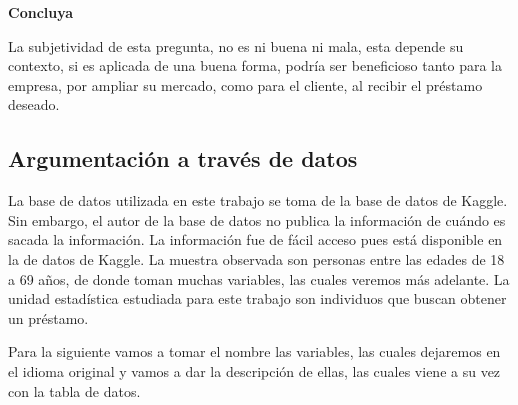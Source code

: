 \documentclass[
  letterpaper,
  DIV=11,
  numbers=noendperiod]{scrreprt}
\begin{document}
\textbf{Concluya}

La subjetividad de esta pregunta, no es ni buena ni mala, esta depende
su contexto, si es aplicada de una buena forma, podría ser beneficioso
tanto para la empresa, por ampliar su mercado, como para el cliente, al
recibir el préstamo deseado.

\subsection{Argumentación a través de
datos}\label{argumentaciuxf3n-a-travuxe9s-de-datos}

La base de datos utilizada en este trabajo se toma de la base de datos
de Kaggle. Sin embargo, el autor de la base de datos no publica la
información de cuándo es sacada la información. La información fue de
fácil acceso pues está disponible en la de datos de Kaggle. La muestra
observada son personas entre las edades de 18 a 69 años, de donde toman
muchas variables, las cuales veremos más adelante. La unidad estadística
estudiada para este trabajo son individuos que buscan obtener un
préstamo.

Para la siguiente vamos a tomar el nombre las variables, las cuales
dejaremos en el idioma original y vamos a dar la descripción de ellas,
las cuales viene a su vez con la tabla de datos.
\end{document}
